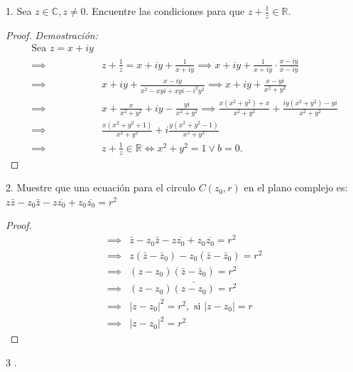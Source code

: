 \documentclass[a4paper,12pt]{article}
\begin{document}
1. Sea $z \in \mathbb{C}, z \neq 0$. Encuentre las condiciones para que $z+\frac{1}{z} \in \mathbb{R}$.\newline\newline 
\begin{proof}
\textit{Demostración:}
\begin{align}
    \text{Sea } z=x+iy\\
    \implies& z+\frac{1}{z} = x+iy +\frac{1}{x+iy}\implies x+iy +\frac{1}{x+iy}\cdot \frac{x-iy}{x-iy}\\
    \implies& x+iy +\frac{x-iy}{x^2-xyi+xyi-i^2y^2}\implies x+iy +\frac{x-yi}{x^2+y^2}\\
    \implies& x+\frac{x}{x^2+y^2}+iy-\frac{yi}{x^2+y^2}\implies \frac{x(x^2+y^2)+x}{x^2+y^2}+\frac{iy(x^2+y^2)-yi}{x^2+y^2}\\
    \implies& \frac{x(x^2+y^2+1)}{x^2+y^2}+i\frac{y(x^2+y^2-1)}{x^2+y^2}\\
    \implies& z+\frac{1}{z} \in \mathbb{R}\Longleftrightarrow x^2+y^2 =1 \lor b=0.
\end{align}
\end{proof}
2. Muestre que una ecuación para el circulo $C\left(z_{0}, r\right)$ en el plano complejo es:
$z \bar{z}-z_{0} \bar{z}-z \overline{z_{0}}+z_{0} \overline{z_{0}}=r^{2}$\newline 
\begin{proof}
\begin{align}
    \implies& \bar{z}-z_{0} \bar{z}-z \overline{z_{0}}+z_{0} \overline{z_{0}}=r^{2}\\
    \implies& z(\bar{z}-\bar{z}_0)-z_0(\bar{z}-\bar{z}_0)=r^{2}\\
    \implies& (z-z_0)(\bar{z}-\bar{z}_0)=r^{2}\\
    \implies& (z-z_0)\bar{(z-z_0)}=r^{2}\\
    \implies& |z-z_0|^2=r^{2}, \text{ si } |z-z_0|=r\\
    \implies& |z-z_0|^2=r^2
\end{align}
\end{proof}
3 .
\end{document}
